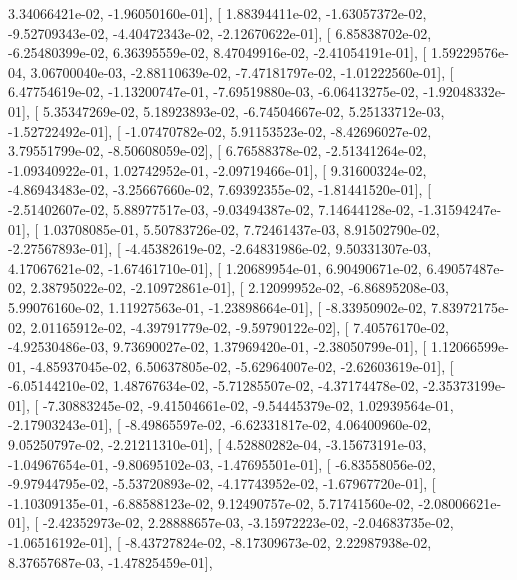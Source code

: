 \documentclass{article}
\begin{document}
          3.34066421e-02,  -1.96050160e-01],
       [  1.88394411e-02,  -1.63057372e-02,  -9.52709343e-02,
         -4.40472343e-02,  -2.12670622e-01],
       [  6.85838702e-02,  -6.25480399e-02,   6.36395559e-02,
          8.47049916e-02,  -2.41054191e-01],
       [  1.59229576e-04,   3.06700040e-03,  -2.88110639e-02,
         -7.47181797e-02,  -1.01222560e-01],
       [  6.47754619e-02,  -1.13200747e-01,  -7.69519880e-03,
         -6.06413275e-02,  -1.92048332e-01],
       [  5.35347269e-02,   5.18923893e-02,  -6.74504667e-02,
          5.25133712e-03,  -1.52722492e-01],
       [ -1.07470782e-02,   5.91153523e-02,  -8.42696027e-02,
          3.79551799e-02,  -8.50608059e-02],
       [  6.76588378e-02,  -2.51341264e-02,  -1.09340922e-01,
          1.02742952e-01,  -2.09719466e-01],
       [  9.31600324e-02,  -4.86943483e-02,  -3.25667660e-02,
          7.69392355e-02,  -1.81441520e-01],
       [ -2.51402607e-02,   5.88977517e-03,  -9.03494387e-02,
          7.14644128e-02,  -1.31594247e-01],
       [  1.03708085e-01,   5.50783726e-02,   7.72461437e-03,
          8.91502790e-02,  -2.27567893e-01],
       [ -4.45382619e-02,  -2.64831986e-02,   9.50331307e-03,
          4.17067621e-02,  -1.67461710e-01],
       [  1.20689954e-01,   6.90490671e-02,   6.49057487e-02,
          2.38795022e-02,  -2.10972861e-01],
       [  2.12099952e-02,  -6.86895208e-03,   5.99076160e-02,
          1.11927563e-01,  -1.23898664e-01],
       [ -8.33950902e-02,   7.83972175e-02,   2.01165912e-02,
         -4.39791779e-02,  -9.59790122e-02],
       [  7.40576170e-02,  -4.92530486e-03,   9.73690027e-02,
          1.37969420e-01,  -2.38050799e-01],
       [  1.12066599e-01,  -4.85937045e-02,   6.50637805e-02,
         -5.62964007e-02,  -2.62603619e-01],
       [ -6.05144210e-02,   1.48767634e-02,  -5.71285507e-02,
         -4.37174478e-02,  -2.35373199e-01],
       [ -7.30883245e-02,  -9.41504661e-02,  -9.54445379e-02,
          1.02939564e-01,  -2.17903243e-01],
       [ -8.49865597e-02,  -6.62331817e-02,   4.06400960e-02,
          9.05250797e-02,  -2.21211310e-01],
       [  4.52880282e-04,  -3.15673191e-03,  -1.04967654e-01,
         -9.80695102e-03,  -1.47695501e-01],
       [ -6.83558056e-02,  -9.97944795e-02,  -5.53720893e-02,
         -4.17743952e-02,  -1.67967720e-01],
       [ -1.10309135e-01,  -6.88588123e-02,   9.12490757e-02,
          5.71741560e-02,  -2.08006621e-01],
       [ -2.42352973e-02,   2.28888657e-03,  -3.15972223e-02,
         -2.04683735e-02,  -1.06516192e-01],
       [ -8.43727824e-02,  -8.17309673e-02,   2.22987938e-02,
          8.37657687e-03,  -1.47825459e-01],
\end{document}
